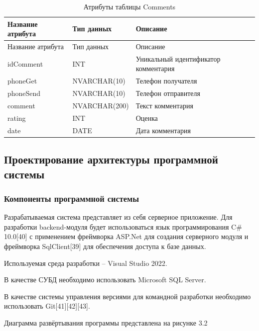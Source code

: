 \begin{xltabular}{\textwidth}{|X|X|X|}
	\caption{Атрибуты таблицы Comments\label{ssevsws:table}}\\ \hline
	\centrow Название атрибута & \centrow Тип данных & \centrow Описание \\ \hline
	\endfirsthead
	\centrow Название атрибута & \centrow Тип данных & \centrow Описание \\ \hline 
	\finishhead
	idComment & INT & Уникальный идентификатор комментария \\ \hline 
	phoneGet & NVARCHAR(10) & Телефон получателя \\ \hline 
	phoneSend & NVARCHAR(10) & Телефон отправителя \\ \hline
	comment & NVARCHAR(200) & Текст комментария \\ \hline
	rating & INT & Оценка \\ \hline
	date & DATE & Дата комментария \\ \hline 
\end{xltabular}

\subsection{Проектирование архитектуры программной системы}
\subsubsection{Компоненты программной системы}

Разрабатываемая система представляет из себя серверное приложение.
Для разработки backend-модуля будет использоваться язык программирования C\# 10.0{[40]} с применением фреймворка ASP.Net для создания серверного модуля и фреймворка SqlClient{[39]} для обеспечения доступа к базе данных.

Используемая среда разработки – Visual Studio 2022.

В качестве СУБД необходимо использовать Microsoft SQL Server.

В качестве системы управления версиями для командной разработки необходимо использовать Git{[41]}{[42]}{[43]}.

Диаграмма развёртывания программы представлена на рисунке 3.2

